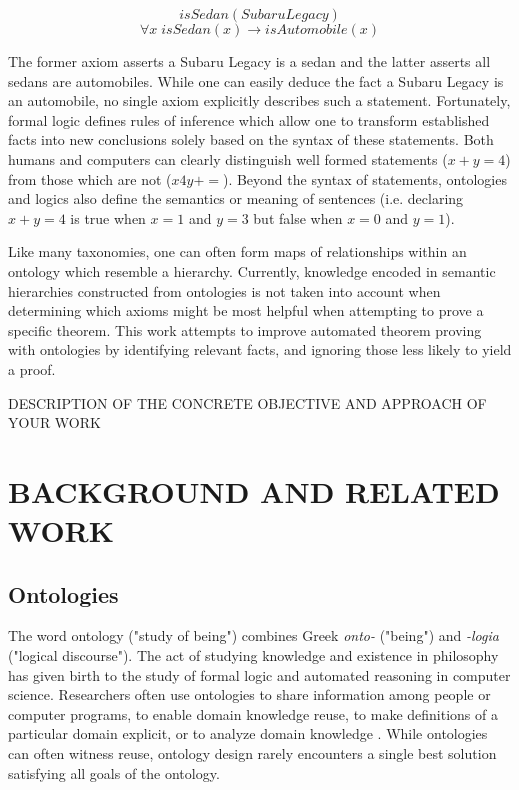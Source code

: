 \documentclass{article}
\begin{document}
\begin{singlespace}
\[isSedan(Subaru Legacy)\]
\[\forall x \; isSedan(x) \rightarrow isAutomobile(x)\]
\end{singlespace}

The former axiom asserts a Subaru Legacy is a sedan and the latter asserts all sedans are automobiles. While one can easily deduce the fact a Subaru Legacy is an automobile, no single axiom explicitly describes such a statement. Fortunately, formal logic defines rules of inference which allow one to transform established facts into new conclusions solely based on the syntax of these statements. Both humans and computers can clearly distinguish well formed statements ($x+y=4$) from those which are not ($x4y+=$). Beyond the syntax of statements, ontologies and logics also define the semantics or meaning of sentences (i.e. declaring $x+y=4$ is true when $x=1$ and $y=3$ but false when $x=0$ and $y=1$). 

Like many taxonomies, one can often form maps of relationships within an ontology which resemble a hierarchy. Currently, knowledge encoded in semantic hierarchies constructed from ontologies is not taken into account when determining which axioms might be most helpful when attempting to prove a specific theorem. This work attempts to improve automated theorem proving with ontologies by identifying relevant facts, and ignoring those less likely to yield a proof.


DESCRIPTION OF THE CONCRETE OBJECTIVE AND APPROACH OF YOUR WORK

\newpage
\vspace*{.05in}
\section{\MakeUppercase{Background and Related Work}}
\subsection{{Ontologies}}

 The word ontology ("study of being") combines Greek \textit{onto-} ("being") and \textit{-logia} ("logical discourse"). The act of studying knowledge and existence in philosophy has given birth to the study of formal logic and automated reasoning in computer science. Researchers often use ontologies to share information among people or computer programs, to enable domain knowledge reuse, to make definitions of a particular domain explicit, or to analyze domain knowledge \cite{noy2001ontology}. While ontologies can often witness reuse, ontology design rarely encounters a single best solution satisfying all goals of the ontology. 
 
\end{document}
